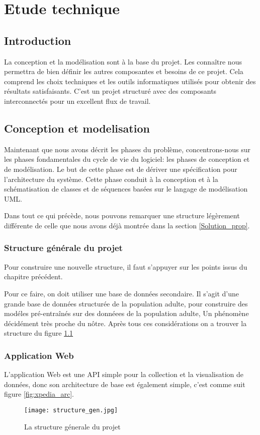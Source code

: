 \chapter{Etude technique}

\section*{Introduction}
La conception et la modélisation sont à la base du projet. Les connaître nous permettra de bien définir les autres composantes et besoins de ce projet. Cela comprend les choix techniques et les outils informatiques utilisés pour obtenir des résultats satisfaisants. C'est un projet  structuré avec des composants interconnectés pour un excellent flux de travail.

\section{Conception et modelisation}
Maintenant que nous avons décrit les phases du problème, concentrons-nous sur les phases fondamentales du cycle de vie du logiciel: les phases de conception et de modélisation. Le but de cette phase est de dériver une spécification pour l'architecture du système. 
Cette phase conduit à la conception et à la schématisation de classes et de séquences basées sur le langage de modélisation UML.

Dans tout ce qui précède, nous pouvons remarquer une structure légèrement différente de celle que nous avons déjà montrée dans la section \ref{Solution_prop}.
    \subsection{Structure générale du projet}
    Pour construire une nouvelle structure, il faut s'appuyer sur les points issus du chapitre précédent.

    Pour ce faire, on doit utiliser une base de données secondaire. Il s'agit d'une grande base de données structurée de la population adulte, pour construire des modéles pré-entraînés sur des donnéees de la population adulte, Un phénomène décidément très proche du nôtre.
    Après tous ces considérations on a trouver la structure du figure \ref{fig:structure_gen}

    \subsection{Application Web}
        L'application Web est une API simple pour la collection et la visualisation de données, donc son architecture de base est également simple, c'est comme suit figure \ref{fig:xpedia_arc}.
    \begin{figure}[H]
        \centering
        \texttt{[image: structure\_gen.jpg]}
        \caption{La structure génerale du projet}\label{fig:structure_gen}
    \end{figure}
    


